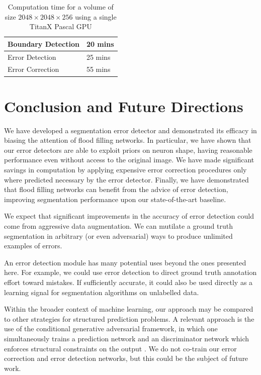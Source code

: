 \documentclass{article}
\begin{document}
\begin{table}[h]
	\caption{Computation time for a volume of size $2048\times 2048\times 256$ using a single TitanX Pascal GPU}
\label{table:timing}
  \centering
  \begin{tabular}{ll}
	  \toprule
	Boundary Detection & 20 mins\\
	\midrule
	Error Detection & 25 mins\\
	\midrule
	Error Correction & 55 mins\\
	\bottomrule
  \end{tabular}
\end{table}

\section{Conclusion and Future Directions}
We have developed a segmentation error detector and demonstrated its efficacy in biasing the attention of flood filling networks. In particular, we have shown that our error detectors are able to exploit priors on neuron shape, having reasonable performance even without access to the original image. We have made significant savings in computation by applying expensive error correction procedures only where predicted necessary by the error detector. Finally, we have demonstrated that flood filling networks can benefit from the advice of error detection, improving segmentation performance upon our state-of-the-art baseline.

We expect that significant improvements in the accuracy of error detection could come from aggressive data augmentation. We can mutilate a ground truth segmentation in arbitrary (or even adversarial) ways to produce unlimited examples of errors.

An error detection module has many potential uses beyond the ones presented here. For example, we could use error detection to direct ground truth annotation effort toward mistakes. If sufficiently accurate, it could also be used directly as a learning signal for segmentation algorithms on unlabelled data.

Within the broader context of machine learning, our approach may be compared to other strategies for structured prediction problems. A relevant approach is the use of the conditional generative adversarial framework, in which one simultaneously trains a prediction network and an discriminator network which enforces structural constraints on the output \cite{cgan1,cgan2}. We do not co-train our error correction and error detection networks, but this could be the subject of future work. 
\end{document}
